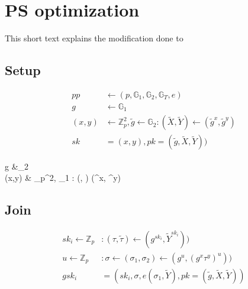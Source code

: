 \documentclass[11pt]{article}
\newenvironment{optimization}{\par\color{blue}}{\par}
\begin{document}
    \section{PS optimization}
    This short text explains the modification done to \cite{pointcheval2016short}

    \subsection{Setup}
    \begin{align}
        pp  & \leftarrow (p,\mathbb{G}_1,\mathbb{G}_2,\mathbb{G}_T,e) \\
        g &\leftarrow \mathbb{G}_1\\
        (x,y) &  \leftarrow \mathbb{Z}_p^{2}, \tilde{g} \leftarrow \mathbb{G}_2 :
        (\tilde{X}, \tilde{Y})  \leftarrow (\tilde{g}^x, \tilde{g}^y)\\
        sk &=(x,y), pk=(\tilde{g}, \tilde{X}, \tilde{Y}))
    \end{align}
    \begin{optimization}
        g &\leftarrow {}_2\\
        (x,y) &  \leftarrow {}_p^{2},  \leftarrow {}_1 :
        (, )  \leftarrow (^x, ^y)
    \end{optimization}

    \subsection{Join}
    \begin{align}
        sk_i \leftarrow \mathbb{Z}_p &:
        (\tau, \tilde{\tau})\leftarrow (g^{sk_i}, \tilde{Y}^{sk_i}))\\
        u \leftarrow \mathbb{Z}_p &: \sigma \leftarrow(\sigma_1, \sigma_2) \leftarrow (g^u, (g^x \tau^y )^u))\\
        gsk_i &=(sk_i,\sigma, e(\sigma_1, \tilde{Y}), pk=(\tilde{g}, \tilde{X}, \tilde{Y}))
    \end{align}
\end{document}
